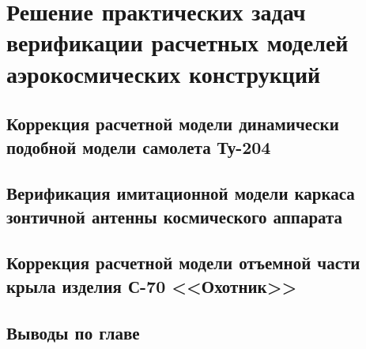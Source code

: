 \chapter{Решение практических задач верификации расчетных моделей аэрокосмических конструкций} 

\section{Коррекция расчетной модели динамически подобной модели самолета Ту-204}

\section{Верификация имитационной модели каркаса зонтичной антенны космического аппарата}

\section{Коррекция расчетной модели отъемной части крыла изделия С-70 <<Охотник>>}

\section{Выводы по главе \thechapter}